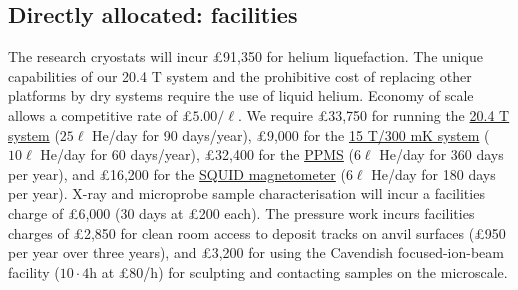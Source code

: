 \documentclass[prl,a4paper,11pt]{revtex4-2}
\begin{document}
\begin{singlespace}
\subsection{Directly allocated: facilities}
\noindent The research cryostats will incur \pounds 91,350 for helium liquefaction. The unique capabilities
of our 20.4 T system and the prohibitive cost of replacing other 
platforms by dry systems require the use of liquid helium.
Economy of scale allows a competitive rate of \pounds $5.00/\ell$. 
We require \pounds 33,750 for running
the \ul{20.4 T system} ($25 \ell$ He/day for
90 days/year),
\pounds 9,000 for the \ul{15 T/300 mK system} ($10 \ell$ He/day
for 60 days/year), \pounds 32,400
for the \ul{PPMS} ($6\ell$ He/day for 360 days per year), and \pounds 16,200 for the \ul{SQUID magnetometer} ($6\ell$ He/day for 180 days per year). 
X-ray and microprobe sample characterisation will incur a facilities charge of \pounds 6,000 (30 days at
\pounds 200 each). The pressure work 
incurs facilities charges of \pounds 2,850 for clean
room access to deposit tracks on anvil surfaces (\pounds 950 per year
over three years), and \pounds 3,200 for using the Cavendish
focused-ion-beam facility ($10\cdot 4$h at \pounds 80/h) for sculpting 
and contacting samples on the  microscale. 



 



\end{singlespace}
\end{document}
